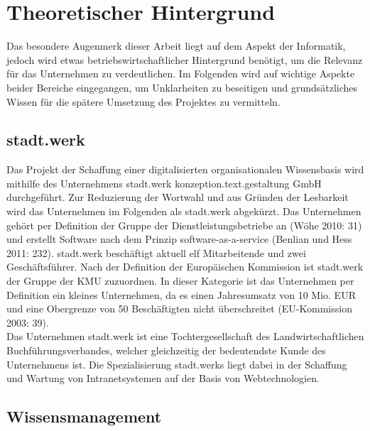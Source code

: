 \documentclass[a4paper]{scrartcl}
\begin{document}
\newpage

\section{Theoretischer Hintergrund}
Das besondere Augenmerk dieser Arbeit liegt auf dem Aspekt der Informatik, jedoch wird etwas betriebswirtschaftlicher Hintergrund benötigt, um die Relevanz für das Unternehmen zu verdeutlichen. Im Folgenden wird auf wichtige Aspekte beider Bereiche eingegangen, um Unklarheiten zu beseitigen und grundsätzliches Wissen für die spätere Umsetzung des Projektes zu vermitteln.

\subsection{stadt.werk}
Das Projekt der Schaffung einer digitalisierten organisationalen Wissensbasis wird mithilfe des Unternehmens stadt.werk konzeption.text.gestaltung GmbH durchgeführt. Zur Reduzierung der Wortwahl und aus Gründen der Lesbarkeit wird das Unternehmen im Folgenden als stadt.werk abgekürzt. Das Unternehmen gehört per Definition der Gruppe der Dienstleistungsbetriebe an (Wöhe 2010: 31) und erstellt Software nach dem Prinzip software-as-a-service (Benlian und Hess 2011: 232). stadt.werk beschäftigt aktuell elf Mitarbeitende und zwei Geschäftsführer. Nach der Definition der Europäischen Kommission ist stadt.werk der Gruppe der KMU zuzuordnen. In dieser Kategorie ist das Unternehmen per Definition ein kleines Unternehmen, da es einen Jahresumsatz von 10 Mio. EUR und eine Obergrenze von 50 Beschäftigten nicht überschreitet (EU-Kommission 2003: 39). \\
Das Unternehmen stadt.werk ist eine Tochtergesellschaft des Landwirtschaftlichen Buchführungsverbandes, welcher gleichzeitig der bedeutendste Kunde des Unternehmens ist. Die Spezialisierung stadt.werks liegt dabei in der Schaffung und Wartung von Intranetsystemen auf der Basis von Webtechnologien.

\subsection{Wissensmanagement}
\end{document}
